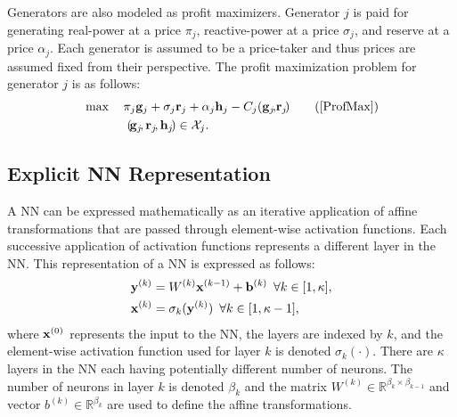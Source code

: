 \documentclass[lettersize,journal]{IEEEtran}
\begin{document}
Generators are also modeled as profit maximizers.  Generator $j$ is paid for generating real-power at a price $\pi_j$, reactive-power at a price $\sigma_j$, and reserve at a price $\alpha_j$.  Each generator is assumed to be a price-taker and thus prices are assumed fixed from their perspective.  The profit maximization problem for generator $j$ is as follows:
\begin{subequations}\label{ProfMax}
\begin{align} 
& \max \ \ \  \pi_j \bold{g}_j + \sigma_j \bold{r}_j + \alpha_j \bold{h}_j - C_j(\bold{g}_{j}\!,\!\bold{r}_{j}\!)\tag{\ref{ProfMax}}\\
&\hspace{35pt}(\!\bold{g}_{j}\!,\bold{r}_{j}\!,\bold{h}_{j}\!)\in\mathcal{X}_j.
\end{align}
\end{subequations}


\subsection{Explicit NN Representation}
A NN can be expressed mathematically as an iterative application of affine transformations that are passed through element-wise activation functions.  Each successive application of activation functions represents a different layer in the NN.  This representation of a NN is expressed as follows:
\begin{subequations}
\begin{align}
&\bold{y}^{(k)}=W^{(k)}\bold{x}^{(k-1)}+\bold{b}^{(k)}  \hspace{5pt} \forall k\in[1,\kappa],\label{explicit2}\\
&\bold{x}^{(k)}=\sigma_k(\bold{y}^{(k)}) \hspace{5pt} \forall k\in[1,\kappa-1],\label{explicit3}
\end{align}\end{subequations}
where $\bold{x}^{(0)}$ represents the input to the NN, the layers are indexed by $k$, and the element-wise activation function used for layer $k$ is denoted $\sigma_k(\cdot)$.  There are $\kappa$ layers in the NN each having potentially different number of neurons.  The number of neurons in layer $k$ is denoted $\beta_k$ and the matrix $W^{(k)}\in\mathbb{R}^{\beta_k\times\beta_{k-1}}$ and vector $b^{(k)}\in\mathbb{R}^{\beta_k}$ are used to define the affine transformations.
\end{document}
